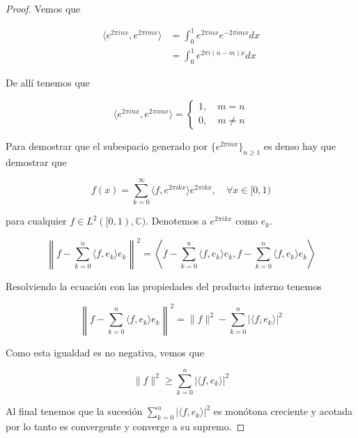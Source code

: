 \begin{proof}
	Vemos que
	
	\begin{align}
		\langle e^{2\pi inx},e^{2\pi imx} \rangle &= \int_{0}^{1} e^{2\pi inx} e^{-2\pi imx} dx\\
		&= \int_{0}^{1} e^{2\pi i(n-m)x} dx
	\end{align}
	
	De allí tenemos que
	
	\begin{equation}
		\langle e^{2\pi inx},e^{2\pi imx} \rangle = \begin{cases}
			1, \quad m=n\\			
			0,\quad m \neq n
		\end{cases}
	\end{equation}
	
	Para demostrar que el subespacio generado por $\{e^{2\pi inx}\}_{n \geq 1}$ es denso hay que demostrar que
	
	\begin{equation}
		f(x) = \sum_{k=0}^{\infty} \langle f,e^{2\pi ikx} \rangle e^{2\pi ikx}, \quad \forall x \in [0,1)
	\end{equation}
	
	para cualquier $f \in L^2([0,1),\mathbb{C})$. Denotemos a $e^{2\pi ikx}$ como $e_k$.
	
	\begin{equation}
		\left\| f - \sum_{k=0}^{n} \langle f,e_k \rangle e_k \right\|^2 = \left\langle f - \sum_{k=0}^{n} \langle f,e_k \rangle e_k, f - \sum_{k=0}^{n} \langle f,e_k \rangle e_k \right\rangle
	\end{equation}
	
	Resolviendo la ecuación con las propiedades del producto interno tenemos
	
	\begin{equation}
		\left\| f - \sum_{k=0}^{n} \langle f,e_k \rangle e_k \right\|^2 = \|f\|^2 - \sum_{k=0}^{n} |\langle f,e_k \rangle|^2
	\end{equation}
	
	Como esta igualdad es no negativa, vemos que
	
	\begin{equation}
		\|f\|^2 \geq \sum_{k=0}^{n} |\langle f,e_k \rangle|^2
	\end{equation}
	
	Al final tenemos que la sucesión $\sum_{k=0}^{n} |\langle f,e_k \rangle|^2$ es monótona creciente y acotada por lo tanto es convergente y converge a su supremo. 
\end{proof}